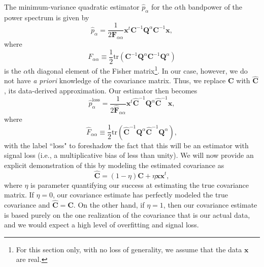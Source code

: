 \documentclass[preprint2,numberedappendix,tighten]{aastex6}  %
\newcommand{\x}{\mathbf{x}}
\newcommand{\C}{\mathbf{C}}
\newcommand{\Chat}{\mathbf{\hat{C}}}
\newcommand{\F}{\mathbf{F}}
\newcommand{\Q}{\mathbf{Q}}
\begin{document}
The minimum-variance quadratic estimator $\hat{p}_\alpha$ for the $\alpha$th bandpower of the power spectrum is given by 
\begin{equation}
\hat{p}_\alpha = \frac{1} {2 \F_{\alpha \alpha} }\x^t \C^{-1} \Q^{\alpha} \C^{-1} \x,
\end{equation}
where
\begin{equation}
F_{\alpha \alpha} \equiv \frac{1}{2} \textrm{tr} \left( \C^{-1} \Q^\alpha \C^{-1} \Q^\alpha \right)
\end{equation}
is the $\alpha$th diagonal element of the Fisher matrix\footnote{For this section only, with no loss of generality, we assume that the data $\textbf{x}$ are real.}. In our case, however, we do not have \emph{a priori} knowledge of the covariance matrix. Thus, we replace $\C$ with $\Chat$, its data-derived approximation. Our estimator then becomes
\begin{equation}
\label{eq:phatloss}
\hat{p}_\alpha^\textrm{loss} = \frac{1} {2 \hat{\F}_{\alpha \alpha} }\x^t \Chat^{-1} \Q^{\alpha} \Chat^{-1} \x,
\end{equation}
where
\begin{equation}
\hat{F}_{\alpha \alpha} \equiv \frac{1}{2} \textrm{tr} \left( \Chat^{-1} \Q^\alpha \Chat^{-1} \Q^\alpha \right),
\end{equation}
with the label ``loss" to foreshadow the fact that this will be an estimator with signal loss (i.e., a multiplicative bias of less than unity). We will now provide an explicit demonstration of this by modeling the estimated covariance as
\begin{equation}
\label{eq:ChatDef}
\Chat = (1-\eta) \C + \eta \x \x^t,
\end{equation}
where $\eta$ is parameter quantifying our success at estimating the true covariance matrix. If $\eta = 0$, our covariance estimate has perfectly modeled the true covariance and $\Chat = \C$. On the other hand, if $\eta =1$, then our covariance estimate is based purely on the one realization of the covariance that is our actual data, and we would expect a high level of overfitting and signal loss.
\end{document}
